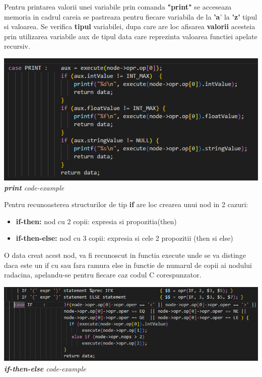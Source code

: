 \documentclass{article}
\begin{document}
Pentru printarea valorii unei variabile prin comanda \textbf{"print"} se acceseaza memoria in cadrul careia se pastreaza pentru fiecare variabila de la \textbf{'a}' la \textbf{'z'} tipul si valoarea. Se verifica \textbf{tipul} variabilei, dupa care are loc afisarea \textbf{valorii} acesteia prin utilizarea variabile aux de tipul data care reprezinta valoarea functiei apelate recursiv.

\begin{center}
\includegraphics[scale = 0.4]{print_example.png}\\
\textit{\textbf{print} code-example}
\end{center}

Pentru recunoasterea structurilor de tip \textbf{if} are loc crearea unui nod in 2 cazuri:\\
\begin{itemize}
\item \textbf{if-then:} nod cu 2 copii: expresia si propozitia(then)
\item \textbf{if-then-else:} nod cu 3 copii: expresia si cele 2 propozitii (then si else)
\end{itemize}
O data creat acest nod, va fi recunoscut in functia execute unde se va distinge daca este un if cu sau fara ramura else in functie de numarul de copii ai nodului radacina, apelandu-se pentru fiecare caz codul C corespunzator.

\begin{center}
\includegraphics[scale = 0.4]{if_code_example.png}\\
\textit{\textbf{if-then-else} code-example}
\end{center}
\end{document}
